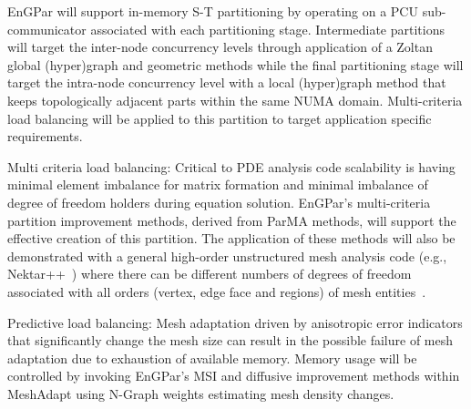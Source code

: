 \documentclass[12pt]{article}
\begin{document}
EnGPar will support in-memory S-T partitioning by operating on a PCU
sub-communicator associated with each partitioning stage.
Intermediate partitions will target the inter-node concurrency levels through
application of a Zoltan global (hyper)graph and geometric methods while the
final partitioning stage will target the intra-node concurrency level with a
local (hyper)graph method that keeps topologically adjacent parts within the
same NUMA domain.
Multi-criteria load balancing will be applied to this partition to target
application specific requirements.

Multi criteria load balancing: Critical to PDE analysis code scalability is
having minimal element imbalance for matrix formation and minimal imbalance of
degree of freedom holders during equation solution.
EnGPar’s multi-criteria partition improvement methods, derived from ParMA
methods, will support the effective creation of this partition.
The application of these methods will also be demonstrated with a general
high-order unstructured mesh analysis code (e.g.,
Nektar++~\cite{Cantwell2015205}) where there can be different numbers of degrees
of freedom associated with all orders (vertex, edge face and regions) of mesh
entities~\cite{shephard1997straightforward}.

Predictive load balancing: Mesh adaptation driven by anisotropic error
indicators that significantly change the mesh size can result in the possible
failure of mesh adaptation due to exhaustion of available memory.
Memory usage will be controlled by invoking EnGPar’s MSI and diffusive
improvement methods within MeshAdapt using N-Graph weights estimating mesh
density changes.
\end{document}
